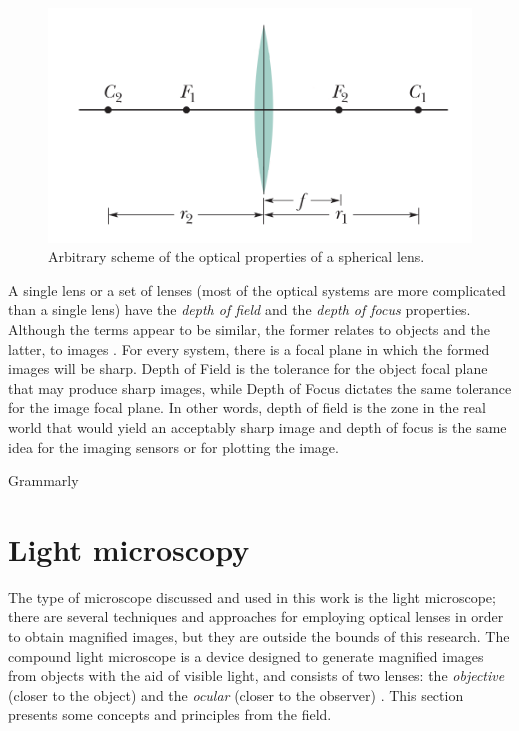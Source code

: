 \begin{figure}[htb]
	\centering
	\caption{\label{fig:spherical_lens}Arbitrary scheme of the optical properties of a spherical lens.}
	\begin{center}
	    \includegraphics[scale=0.4]{images/fig4.png}
	\end{center}
	\centering
\end{figure}

A single lens or a set of lenses (most of the optical systems are more complicated than a single lens) have the \emph{depth of field} and the \emph{depth of focus} properties. Although the terms appear to be similar, the former relates to objects and the latter, to images \cite{davidson2002optical}. For every system, there is a focal plane in which the formed images will be sharp. Depth of Field is the tolerance for the object focal plane that may produce sharp images, while Depth of Focus dictates the same tolerance for the image focal plane. In other words, depth of field is the zone in the real world that would yield an acceptably sharp image and depth of focus is the same idea for the imaging sensors or for plotting the image.

{\color{red} Grammarly}
\section{Light microscopy}
\label{sec:light_microscopy}

The type of microscope discussed and used in this work is the light microscope; there are several techniques and approaches for employing optical lenses in order to obtain magnified images, but they are outside the bounds of this research. The compound light microscope is a device designed to generate magnified images from objects with the aid of visible light, and consists of two lenses: the \emph{objective} (closer to the object) and the \emph{ocular} (closer to the observer) \cite{murphy2012fundamentals}. This section presents some concepts and principles from the field.

